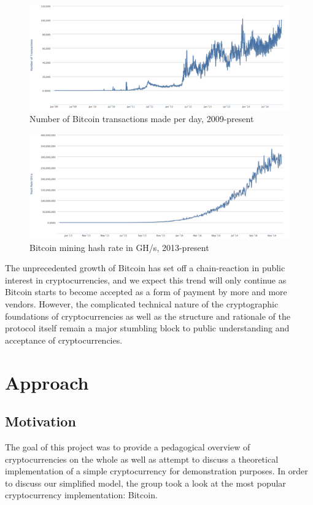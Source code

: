 \documentclass[12pt]{article}
\begin{document}
\begin{figure}[h!]
  \centering
  \includegraphics[width=\textwidth]{chart-transactions.png}
  \caption{Number of Bitcoin transactions made per day, 2009-present\cite{blockchain:transactions}}
\end{figure}
\begin{figure}[h!]
  \centering
  \includegraphics[width=\textwidth]{chart-hashrate.png}
  \caption{Bitcoin mining hash rate in GH/s, 2013-present\cite{blockchain:hashrate}}
\end{figure}

The unprecedented growth of Bitcoin has set off a chain-reaction in public interest in cryptocurrencies, and we expect this trend will only continue as Bitcoin starts to become accepted as a form of payment by more and more vendors\cite{chokun:vendors}. However, the complicated technical nature of the cryptographic foundations of cryptocurrencies as well as the structure and rationale of the protocol itself remain a major stumbling block to public understanding and acceptance of cryptocurrencies. 

\section{Approach}
\subsection{Motivation}
The goal of this project was to provide a pedagogical overview of cryptocurrencies on the whole
as well as attempt to discuss a theoretical implementation of a simple cryptocurrency for
demonstration purposes. In order to discuss our simplified model, the group took a look at
the most popular cryptocurrency implementation: Bitcoin.
\end{document}
